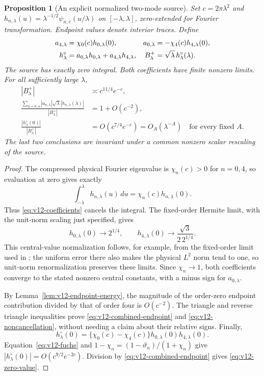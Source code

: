 \documentclass[11pt]{article}
\newtheorem{proposition}[theorem]{Proposition}
\theoremstyle{remark}
\begin{document}
\begin{proposition}[An explicit normalized two-mode source]
\label{prop:v12-source}
Set $c=2\pi\lambda^2$ and
$h_{n,\lambda}(u)=\lambda^{-1/2}\psi_{n,c}(u/\lambda)$ on
$[-\lambda,\lambda]$, zero-extended for Fourier transformation.
Endpoint values denote interior traces. Define
\begin{align}
 a_{4,\lambda}&=\chi_0(c)h_{0,\lambda}(0),&
 a_{0,\lambda}&=-\chi_4(c)h_{4,\lambda}(0),\label{eq:v12-coefficients}\\
 h_\lambda^\circ&=a_{0,\lambda}h_{0,\lambda}
                 +a_{4,\lambda}h_{4,\lambda},&
 B_\lambda^+&=\sqrt\lambda\,h_\lambda^\circ(\lambda).
 \notag
\end{align}
The source has exactly zero integral. Both coefficients have finite
nonzero limits. For all sufficiently large $\lambda$,
\begin{align}
 |B_\lambda^+|&\asymp c^{11/4}e^{-c},\label{eq:v12-combined-endpoint}\\
 \frac{\sum_{n=0,4}|a_{n,\lambda}|\sqrt\lambda
                 |h_{n,\lambda}(\lambda)|}{|B_\lambda^+|}
     &=1+O(c^{-2}),\label{eq:v12-noncancellation}\\
 \frac{|h_\lambda^\circ(0)|}{|B_\lambda^+|}
     &=O(c^{7/4}e^{-c})=O_A(\lambda^{-A})
       \quad\text{for every fixed }A.\label{eq:v12-zero-value}
\end{align}
The last two conclusions are invariant under a common nonzero scalar
rescaling of the source.
\end{proposition}
\begin{proof}
The compressed physical Fourier eigenvalue is $\chi_n(c)>0$ for
$n=0,4$, so evaluation at zero gives exactly
\[
 \int_{-\lambda}^{\lambda}h_{n,\lambda}(u)\,du
       =\chi_n(c)h_{n,\lambda}(0).
\]
Thus \eqref{eq:v12-coefficients} cancels the integral. The fixed-order
Hermite limit, with the unit-norm scaling just specified, gives
\[
 h_{0,\lambda}(0)\longrightarrow2^{1/4},\qquad
 h_{4,\lambda}(0)\longrightarrow
       \frac{\sqrt3}{2\,2^{1/4}}.
\]
This central-value normalization follows, for example, from the
fixed-order limit used in \cite[Lemma~7.2]{ConnesConsaniMoscovici2025};
the uniform error there also makes the physical $L^2$ norm tend to one,
so unit-norm renormalization preserves these limits. Since $\chi_n\to1$,
both coefficients converge to the stated nonzero central constants,
with a minus sign for $a_{0,\lambda}$.

By Lemma~\ref{lem:v12-endpoint-energy}, the magnitude of the order-zero
endpoint contribution divided by that of order four is $O(c^{-2})$.
The triangle and reverse triangle inequalities prove
\eqref{eq:v12-combined-endpoint} and \eqref{eq:v12-noncancellation},
without needing a claim about their relative signs. Finally,
\[
 h_\lambda^\circ(0)
   =\{\chi_0(c)-\chi_4(c)\}
       h_{0,\lambda}(0)h_{4,\lambda}(0).
\]
Equation~\eqref{eq:v12-fuchs} and
$1-\chi_n=(1-\vartheta_n)/(1+\chi_n)$ give
$|h_\lambda^\circ(0)|=O(c^{9/2}e^{-2c})$.
Division by \eqref{eq:v12-combined-endpoint} gives
\eqref{eq:v12-zero-value}.
\end{proof}
\end{document}
